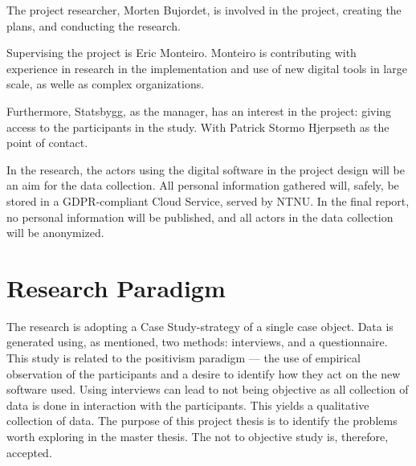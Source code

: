 The project researcher, Morten Bujordet, is involved in the project, creating the plans, and conducting the research.
	 
Supervising the project is Eric Monteiro. Monteiro is contributing with experience in research in the implementation and use of new digital tools in large scale, as welle as complex organizations. 

Furthermore, Statsbygg, as the manager, has an interest in the project: giving access to the participants in the study. With Patrick Stormo Hjerpseth as the point of contact.
	 
In the research, the actors using the digital software in the project design will be an aim for the data collection. All personal information gathered will, safely, be stored in a GDPR-compliant Cloud Service, served by NTNU. In the final report, no personal information will be published, and all actors in the data collection will be anonymized.


\section{Research Paradigm}

The research is adopting a Case Study-strategy of a single case object. Data is generated using, as mentioned, two methods: interviews, and a questionnaire. This study is related to the positivism paradigm — the use of empirical observation of the participants and a desire to identify how they act on the new software used. Using interviews can lead to not being objective as all collection of data is done in interaction with the participants. This yields a qualitative collection of data. The purpose of this project thesis is to identify the problems worth exploring in the master thesis. The not to objective study is, therefore, accepted.

\cleardoublepage